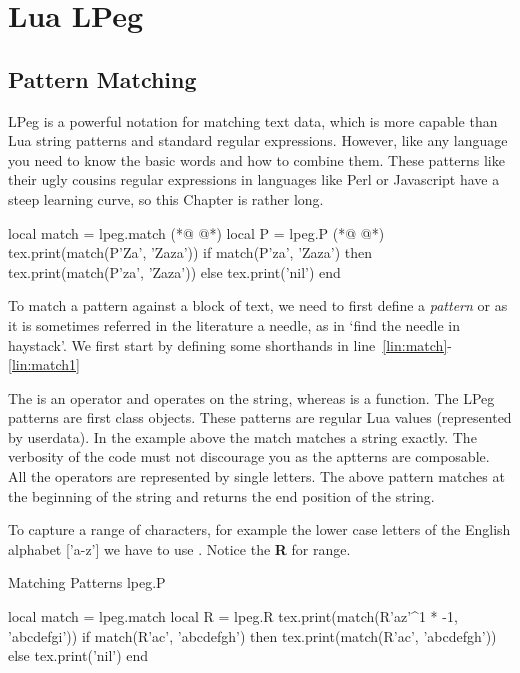 \chapter{Lua LPeg}

\section{Pattern Matching}

LPeg is a powerful notation for matching text data, which is more capable than Lua string patterns and standard regular expressions. However, like any language you need to know the basic words and how to combine them. These patterns like their ugly cousins regular expressions in languages like Perl or Javascript have a steep learning curve, so this Chapter is rather long. 

\begin{scriptexample}{}{}
\begin{teX}
   local match = lpeg.match   (*@ \label{lin:match} @*)
   local P = lpeg.P                  (*@ \label{lin:match1} @*)
   tex.print(match(P'Za', 'Zaza'))
   if match(P'za', 'Zaza') then 
      tex.print(match(P'za', 'Zaza')) 
   else tex.print('nil') 
   end
\end{teX}
\end{scriptexample}

To match a pattern against a block of text, we need to first define a \emph{pattern} or as it is sometimes referred in the literature a needle, as in `find the needle in haystack'. We first start by defining some shorthands in line~\ref{lin:match}-\ref{lin:match1}

The  is an operator and operates on the string, whereas  is a function. The LPeg patterns are first class objects. These patterns are regular Lua values (represented by userdata). In the example above the match matches a string exactly. The verbosity of the code must not discourage you as the aptterns are composable. All the operators are represented by single letters.  The above pattern matches at the beginning of the string and returns the end position of the string. 

To capture a range of characters, for example the lower case letters of the English alphabet  ['a-z'] we have to use . Notice the \textbf{R} for range.

\begin{texexample}{Matching Patterns lpeg.P}{}
\begin{luacode}
   local match = lpeg.match 
   local R = lpeg.R 
   tex.print(match(R'az'^1 * -1, 'abcdefgi'))
   if match(R'ac', 'abcdefgh') then 
      tex.print(match(R'ac', 'abcdefgh')) 
   else 
      tex.print('nil') 
   end
\end{luacode}
\end{texexample}

